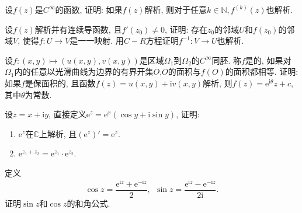 \begin{yyEx}
    设$f(z)$是$C^{\infty}$的函数, 证明: 如果$f(z)$解析, 则对于任意$k\in\mathbb{N},f^{(k)}(z)$也解析.
\end{yyEx}

\begin{yyEx}
    设$f(z)$解析并有连续导函数, 且$f'(z_0)\neq 0$, 证明: 存在$z_0$的邻域$U$和$f(z_0)$的邻域$V$, 使得$f:U\to V$是一一映射. 用$C-R$方程证明$f^{-1}:V\to U$也解析.
\end{yyEx}

\begin{yyEx}
    设$f:(x,y)\mapsto (u(x,y),v(x,y))$是区域$\Omega_1$到$\Omega_2$的$C^{\infty}$同胚. 称$f$是的, 如果对$\Omega_1$内的任意以光滑曲线为边界的有界开集$O$,$O$的面积与$f(O)$的面积都相等. 证明: 如果$f$是保面积的, 且函数$f(z) = u(x,y)+\mathrm{i}v(x,y)$解析, 则$f(z) = \mathrm{e}^{\mathrm{i}\theta}z+c$, 其中$\theta$为常数.
\end{yyEx}

\begin{yyEx}
    设$z = x+\mathrm{i}y$, 直接定义$\mathrm{e}^z = \mathrm{e}^x(\cos y+\mathrm{i}\sin y)$, 证明:
    \begin{enumerate}
        \item $\mathrm{e}^z$在$\mathbb{C}$上解析, 且$(\mathrm{e}^z)' = \mathrm{e}^z$.
        \item $\mathrm{e}^{z_1+z_2} = \mathrm{e}^{z_1}\cdot\mathrm{e}^{z_2}$.
    \end{enumerate}
\end{yyEx}

\begin{yyEx}
    定义\begin{equation*}
        \cos z = \frac{\mathrm{e}^{\mathrm{i}z}+\mathrm{e}^{-\mathrm{i}z}}{2},~~\sin z = \frac{\mathrm{e}^{\mathrm{i}z}-\mathrm{e}^{-\mathrm{i}z}}{2\mathrm{i}}.
    \end{equation*}
    证明$\sin z$和$\cos z$的和角公式.
\end{yyEx}

